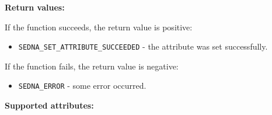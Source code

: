 \documentclass[a4paper,12pt]{article}
\newenvironment{citemize}
{\begin{itemize}
  \setlength{\itemsep}{0pt}
  \setlength{\parskip}{0pt}
  \setlength{\parsep}{0pt}}
{\end{itemize}}
\begin{document}
\noindent
\textbf{Return values:}

\medskip

\noindent
If the function succeeds, the return value is positive:

\begin{citemize}
\item\verb!SEDNA_SET_ATTRIBUTE_SUCCEEDED! - the attribute was set successfully.
\end{citemize}

\noindent
If the function fails, the return value is negative:

\begin{citemize}
\item\verb!SEDNA_ERROR! - some error occurred.
\end{citemize}

\medskip

\noindent
\textbf{Supported attributes:}
\end{document}
